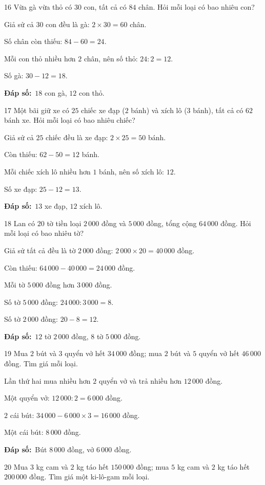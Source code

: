 \documentclass[11pt]{article}
\newif\ifsol \solfalse
\providecommand{\AnsWord}{Đáp số}
\newcommand{\dapso}[1]{\par\textbf{\AnsWord:}\ #1}
\newcommand{\probsol}[1]{%
  \begin{lrbox}{\solmeasure}\begin{minipage}{\dimexpr\linewidth-24pt\relax}#1\end{minipage}\end{lrbox}%
  \ifsol
    \begin{solbox}#1\end{solbox}%
  \else
    \setlength{\solht}{\dimexpr\ht\solmeasure+\dp\solmeasure+0.85cm\relax}%
    \ifdim\solht<1.35cm\setlength{\solht}{1.35cm}\fi
    \begin{tcolorbox}[colback=white,colframe=Line,boxrule=0.8pt,arc=5pt,
      left=8pt,right=8pt,top=4pt,bottom=4pt,height=\solht]{\footnotesize\color{Slate}\itshape\WorkWord}\end{tcolorbox}%
  \fi}
\newcommand{\gap}{\vspace{0.3cm}}
\def\WorkWord{Bài làm:}
\def\AnsWord{Đáp số}
\begin{document}
\gap
\begin{probbox}{16}{\relax}
Vừa gà vừa thỏ có $30$ con, tất cả có $84$ chân. Hỏi mỗi loại có bao nhiêu con?
\end{probbox}
\probsol{
Giả sử cả $30$ con đều là gà: $2\times30=60$ chân.\par Số chân còn thiếu: $84-60=24$.\par Mỗi con thỏ nhiều hơn $2$ chân, nên số thỏ: $24:2=12$.\par Số gà: $30-12=18$.
\dapso{$18$ con gà, $12$ con thỏ.}}
\gap
\begin{probbox}{17}{\relax}
Một bãi giữ xe có $25$ chiếc xe đạp ($2$ bánh) và xích lô ($3$ bánh), tất cả có $62$ bánh xe. Hỏi mỗi loại có bao nhiêu chiếc?
\end{probbox}
\probsol{
Giả sử cả $25$ chiếc đều là xe đạp: $2\times25=50$ bánh.\par Còn thiếu: $62-50=12$ bánh.\par Mỗi chiếc xích lô nhiều hơn $1$ bánh, nên số xích lô: $12$.\par Số xe đạp: $25-12=13$.
\dapso{$13$ xe đạp, $12$ xích lô.}}
\gap
\begin{probbox}{18}{\relax}
Lan có $20$ tờ tiền loại $2\,000$ đồng và $5\,000$ đồng, tổng cộng $64\,000$ đồng. Hỏi mỗi loại có bao nhiêu tờ?
\end{probbox}
\probsol{
Giả sử tất cả đều là tờ $2\,000$ đồng: $2\,000\times20=40\,000$ đồng.\par Còn thiếu: $64\,000-40\,000=24\,000$ đồng.\par Mỗi tờ $5\,000$ đồng hơn $3\,000$ đồng.\par Số tờ $5\,000$ đồng: $24\,000:3\,000=8$.\par Số tờ $2\,000$ đồng: $20-8=12$.
\dapso{$12$ tờ $2\,000$ đồng, $8$ tờ $5\,000$ đồng.}}
\gap
\begin{probbox}{19}{\relax}
Mua $2$ bút và $3$ quyển vở hết $34\,000$ đồng; mua $2$ bút và $5$ quyển vở hết $46\,000$ đồng. Tìm giá mỗi loại.
\end{probbox}
\probsol{
Lần thứ hai mua nhiều hơn $2$ quyển vở và trả nhiều hơn $12\,000$ đồng.\par Một quyển vở: $12\,000:2=6\,000$ đồng.\par $2$ cái bút: $34\,000-6\,000\times3=16\,000$ đồng.\par Một cái bút: $8\,000$ đồng.
\dapso{Bút $8\,000$ đồng, vở $6\,000$ đồng.}}
\gap
\begin{probbox}{20}{\relax}
Mua $3$ kg cam và $2$ kg táo hết $150\,000$ đồng; mua $5$ kg cam và $2$ kg táo hết $200\,000$ đồng. Tìm giá một ki-lô-gam mỗi loại.
\end{probbox}
\end{document}
